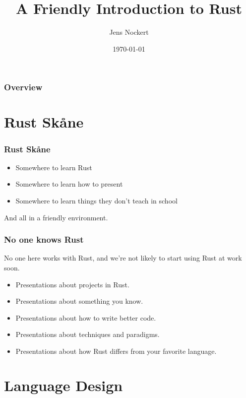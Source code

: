 \documentclass{beamer}
\title[A Friendly Introduction to Rust]{A Friendly Introduction to Rust}
\author{Jens Nockert}
\institute[jens.nockert@topvisible.se]{\textit{jens.nockert@topvisible.se}}
\date{\today}
\begin{document}
\begin{frame}
\titlepage
\end{frame}



\begin{frame}
\frametitle{Overview}
\tableofcontents
\end{frame}



\section{Rust Skåne}

\begin{frame}
  \frametitle{Rust Skåne}

  \begin{itemize}[<+->]
    \item Somewhere to learn Rust
    \item Somewhere to learn how to present
    \item Somewhere to learn things they don't teach in school
  \end{itemize}
  
  \pause
  
  And all in a friendly environment.
\end{frame}




\begin{frame}
  \frametitle{No one knows Rust}

  No one here works with Rust, and we're not likely to start using Rust at work soon. \pause

  \begin{itemize}[<+->]
    \item Presentations about projects in Rust.
    \item Presentations about something you know.
    \item Presentations about how to write better code.
    \item Presentations about techniques and paradigms.
    \item Presentations about how Rust differs from your favorite language.
  \end{itemize}
\end{frame}



\section{Language Design}
\end{document}

